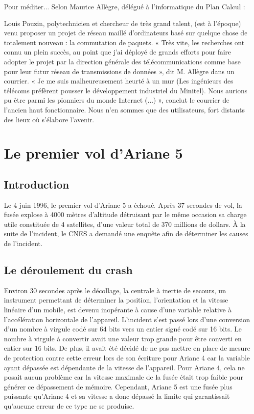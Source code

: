 \documentclass[12pt]{report}
\begin{document}
Pour méditer... Selon Maurice Allègre, délégué à l'informatique du Plan Calcul :

\og Louis Pouzin, polytechnicien et chercheur de très grand talent, (est à l'époque) venu proposer un projet de réseau maillé d'ordinateurs basé sur quelque chose de totalement nouveau : la commutation de paquets. « Très vite, les recherches ont connu un plein succès, au point que j'ai déployé de grands efforts pour faire adopter le projet par la direction générale des télécommunications comme base pour leur futur réseau de transmissions de données », dit M. Allègre dans un courrier. « Je me suis malheureusement heurté à un mur (Les ingénieurs des télécoms préfèrent pousser le développement industriel du Minitel). Nous aurions pu être parmi les pionniers du monde Internet (...) », conclut le courrier de l'ancien haut fonctionnaire. Nous n'en sommes que des utilisateurs, fort distants des lieux où s'élabore l'avenir. \fg\cite{wikipouzin}


\chapter{Le premier vol d'Ariane 5}

\section{Introduction}

Le 4 juin 1996, le premier vol d'Ariane 5 a échoué. Après 37 secondes de vol, la fusée explose à 4000 mètres d'altitude 
détruisant par le même occasion sa charge utile constituée de 4 satellites, d'une valeur total de 370 millions de dollars.
À la suite de l'incident, le CNES a demandé une enquête afin de déterminer les causes de l'incident.

\section{Le déroulement du crash}

Environ 30 secondes après le décollage, la centrale à inertie de secours, un instrument permettant de déterminer la position, l'orientation et la vitesse linéaire d'un mobile, est devenu inopérante à cause d'une variable relative à l'accélération horizontale de l'appareil. L'incident s'est passé lors d'une conversion    
d'un nombre à virgule codé sur 64 bits vers un entier signé codé sur 16 bits. Le nombre à virgule à convertir avait une valeur trop grande pour être converti en entier sur 16 bits. De plus, il avait été décidé de ne pas mettre en place de mesure de protection contre cette erreur lors de son écriture pour Ariane 4 car la variable ayant dépassée est dépendante de la vitesse de l'appareil. Pour Ariane 4, cela ne posait aucun problème car la vitesse maximale de la fusée était trop faible pour générer ce dépassement de mémoire. Cependant, Ariane 5 est une fusée plus puissante qu'Ariane 4 et sa vitesse a donc dépassé la limite qui garantissait qu'aucune erreur de ce type ne se produise\cite{ariane}.
\end{document}
